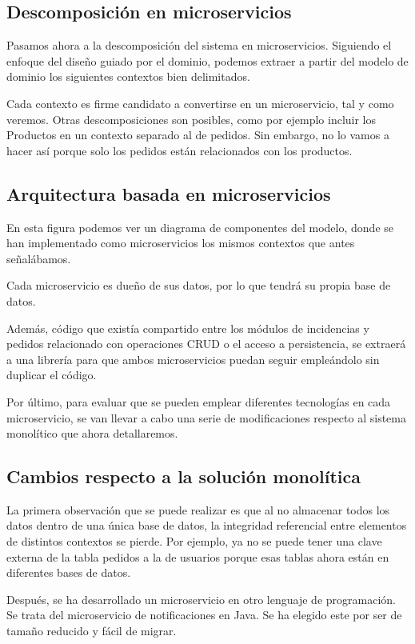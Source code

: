 \documentclass[11pt,a4paper]{article}
\begin{document}
\subsection{Descomposición en microservicios}

Pasamos ahora a la descomposición del sistema en microservicios. Siguiendo el enfoque del diseño guiado por el dominio, podemos extraer a partir del modelo de dominio los siguientes contextos bien delimitados.

Cada contexto es firme candidato a convertirse en un microservicio, tal y como veremos. Otras descomposiciones son posibles, como por ejemplo incluir los Productos en un contexto separado al de pedidos. Sin embargo, no lo vamos a hacer así porque solo los pedidos están relacionados con los productos.

\subsection{Arquitectura basada en microservicios}

En esta figura podemos ver un diagrama de componentes del modelo, donde se han implementado como microservicios los mismos contextos que antes señalábamos.

Cada microservicio es dueño de sus datos, por lo que tendrá su propia base de datos. 

Además, código que existía compartido entre los módulos de incidencias y pedidos relacionado con operaciones CRUD o el acceso a persistencia, se extraerá a una librería para que ambos microservicios puedan seguir empleándolo sin duplicar el código.

Por último, para evaluar que se pueden emplear diferentes tecnologías en cada microservicio, se van llevar a cabo una serie de modificaciones respecto al sistema monolítico que ahora detallaremos.

\subsection{Cambios respecto a la solución monolítica}

La primera observación que se puede realizar es que al no almacenar todos los datos dentro de una única base de datos, la integridad referencial entre elementos de distintos contextos se pierde. Por ejemplo, ya no se puede tener una clave externa de la tabla pedidos a la de usuarios porque esas tablas ahora están en diferentes bases de datos.

Después, se ha desarrollado un microservicio en otro lenguaje de programación. Se trata del microservicio de notificaciones en Java. Se ha elegido este por ser de tamaño reducido y fácil de migrar.
\end{document}
